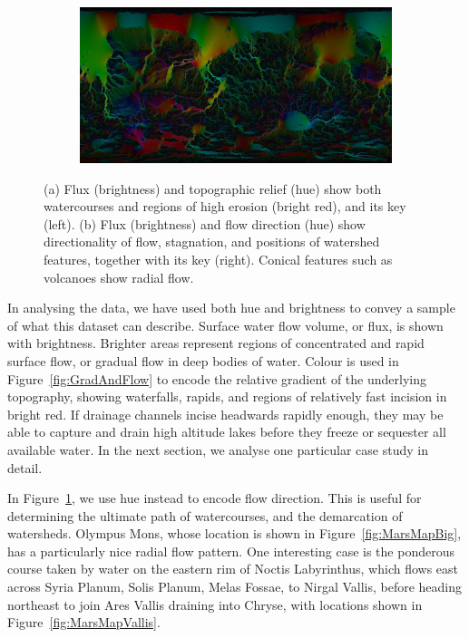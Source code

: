 \documentclass[12pt]{iopart}
\numberwithin{equation}{section}
\begin{document}
\begin{figure}
    \begin{subfigure}[b]{1.0\textwidth}
      \includegraphics[width=\textwidth]{FlowDirections.jpg}
      \caption{}
      \label{fig:FlowDirections}
    \end{subfigure}
    \caption{\small{(a) Flux (brightness) and topographic relief (hue) show both watercourses and regions of high erosion (bright red), and its key (left). (b) Flux (brightness) and flow direction (hue) show directionality of flow, stagnation, and positions of watershed features, together with its key (right). Conical features such as volcanoes show radial flow.}}
\label{fig:Results2}
\end{figure}

In analysing the data, we have used both hue and brightness to convey a sample of what this dataset can describe. Surface water flow volume, or flux, is shown with brightness. Brighter areas represent regions of concentrated and rapid surface flow, or gradual flow in deep bodies of water. Colour is used in Figure~\ref{fig:GradAndFlow} to encode the relative gradient of the underlying topography, showing waterfalls, rapids, and regions of relatively fast incision in bright red. If drainage channels incise headwards rapidly enough, they may be able to capture and drain high altitude lakes before they freeze or sequester all available water. In the next section, we analyse one particular case study in detail. 

In Figure~\ref{fig:FlowDirections}, we use hue instead to encode flow direction. This is useful for determining the ultimate path of watercourses, and the demarcation of watersheds. Olympus Mons, whose location is shown in Figure~\ref{fig:MarsMapBig}, has a particularly nice radial flow pattern. One interesting case is the ponderous course taken by water on the eastern rim of Noctis Labyrinthus, which flows east across Syria Planum, Solis Planum, Melas Fossae, to Nirgal Vallis, before heading northeast to join Ares Vallis draining into Chryse, with locations shown in Figure~\ref{fig:MarsMapVallis}. 
\end{document}
